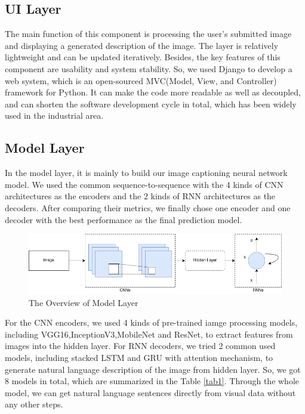 \documentclass{article}
\begin{document}
\subsection{UI Layer}
The main function of this component is processing the user's submitted image and displaying a generated description of the image. The layer is relatively lightweight and can be updated iteratively. Besides, the key features of this component are usability and system stability. So, we used Django to develop a web system, which is an open-sourced MVC(Model, View, and Controller) framework for Python. It can make the code more readable as well as decoupled, and can shorten the software development cycle in total, which has been widely used in the industrial area.

\subsection{Model Layer}
In the model layer, it is mainly to build our image captioning neural network model. We used the common sequence-to-sequence with the 4 kinds of CNN architectures as the encoders and the 2 kinds of RNN architectures as the decoders. After comparing their metrics, we finally chose one encoder and one decoder with the best performance as the final prediction model.

\begin{figure}[h]
\centering
\includegraphics[width=1\textwidth]{model.png}
\caption{The Overview of Model Layer}
\label{fig2}
\end{figure}

For the CNN encoders, we used 4 kinds of pre-trained iamge processing models, including VGG16\cite{simonyan2014very},InceptionV3\cite{szegedy2016rethinking},MobileNet\cite{howard2017mobilenets} and ResNet\cite{he2016deep}, to extract features from images into the hidden layer. For RNN decoders, we tried 2 common used models, including stacked LSTM and GRU with attention mechanism, to generate natural language description of the image from hidden layer. So, we got 8 models in total, which are summarized in the Table \ref{tab1}. Through the whole model, we can get natural language sentences directly from visual data without any other steps.
\end{document}
